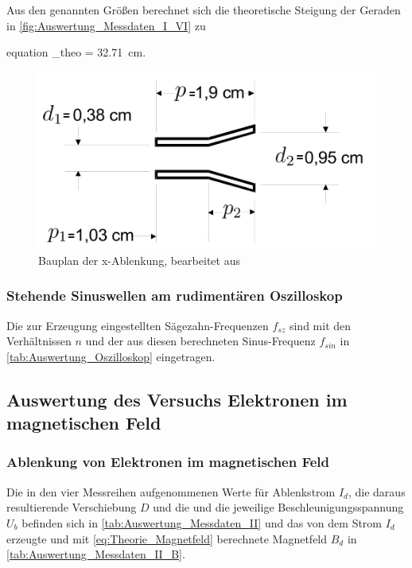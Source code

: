 		Aus den genannten Größen berechnet sich die theoretische Steigung der 
		Geraden in \cref{fig:Auswertung_Messdaten_I_VI} zu
		\begin{empheq}{equation} 
			\alpha_{theo} = \SI{32.71}{\centi\meter}.
		\end{empheq}	
		\begin{figure}[!h]
			\centering
			\includegraphics[scale=0.7]{Grafiken/Bauplan.PNG}
			\caption{Bauplan der x-Ablenkung, bearbeitet aus \cite{V501}}\label{fig:Auswertung_Bauplan}
		\end{figure}
		
	\subsubsection{Stehende Sinuswellen am rudimentären Oszilloskop}

		Die zur Erzeugung eingestellten Sägezahn-Frequenzen $f_{sz}$ sind
		mit den Verhältnissen $n$ und der aus diesen berechneten Sinus-Frequenz
		$f_{sin}$ in \cref{tab:Auswertung_Oszilloskop} eingetragen.
		
		 
		
\subsection{Auswertung des Versuchs Elektronen im magnetischen Feld}

	\subsubsection{Ablenkung von Elektronen im magnetischen Feld}
	
		Die in den vier Messreihen aufgenommenen Werte für Ablenkstrom $I_{d}$,
		die daraus resultierende Verschiebung $D$ und die und die jeweilige 
		Beschleunigungsspannung $U_{b}$ befinden sich in 
		\cref{tab:Auswertung_Messdaten_II} und das von dem Strom $I_{d}$ 
		erzeugte und mit \cref{eq:Theorie_Magnetfeld} berechnete Magnetfeld $B_{d}$ in \cref{tab:Auswertung_Messdaten_II_B}.
		

